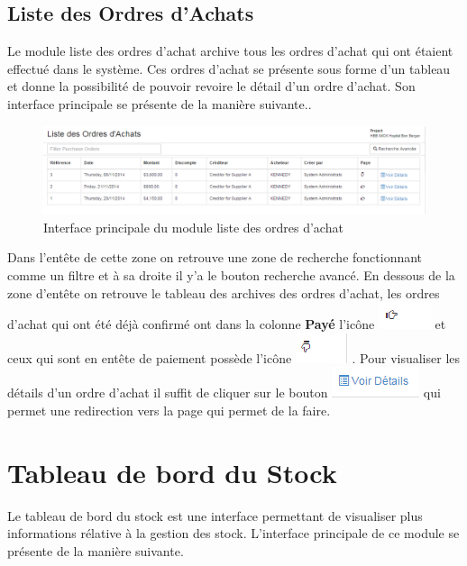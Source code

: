 \documentclass[12pt,a4paper]{report}
\begin{document}
\newpage
\subsection{Liste des Ordres d'Achats}
Le module liste des ordres d'achat archive tous les ordres d'achat qui ont étaient effectué dans le système. Ces ordres d'achat se présente sous forme d'un tableau et donne la possibilité de pouvoir revoire le détail d'un ordre d'achat. Son interface principale se présente de la manière suivante..

\begin{figure}[h]
\begin{center}
\includegraphics[width=12cm]{pic/ListeOrdreAchat.png}
\end{center}
\caption{Interface principale du module liste des ordres d'achat}
\label{Interface principale du module liste des ordres d'achat}
\end{figure} 

Dans l'entête de cette zone on retrouve une zone de recherche fonctionnant comme un filtre et à sa droite il y'a le bouton recherche avancé.
En dessous de la zone d'entête on retrouve le tableau des archives des ordres d'achat, les ordres d'achat qui ont été déjà confirmé ont dans la colonne \textbf{Payé} l'icône \includegraphics[scale=0.7]{pic/OkCOnfPOrd.png} et ceux qui sont en entête de paiement possède l'icône \includegraphics[scale=0.7]{pic/OrConKO.png} . Pour visualiser les détails d'un ordre d'achat il suffit de cliquer sur le bouton \includegraphics[scale=0.7]{pic/VoirDetail.png} qui permet une redirection vers la page qui permet de la faire. 

\newpage
\section{Tableau de bord du Stock}
Le tableau de bord du stock est une interface permettant de visualiser plus informations rélative à la gestion des stock. L'interface principale de ce module se présente de la manière suivante.
\end{document}
